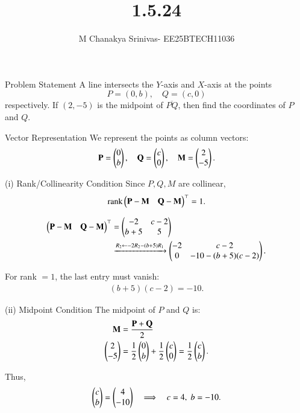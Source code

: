 \documentclass{beamer}
\title %
{1.5.24}
\date{}
\author %
{M Chanakya Srinivas- EE25BTECH11036}
\begin{document}
\begin{frame}
  \titlepage
\end{frame}



\begin{frame}{Problem Statement}
A line intersects the $Y$-axis and $X$-axis at the points
\[
P = (0,b), \quad Q = (c,0)
\]
respectively. If $(2,-5)$ is the midpoint of $\overline{PQ}$, then find the coordinates of $P$ and $Q$.
\end{frame}

\begin{frame}{Vector Representation}
We represent the points as column vectors:
\[
\mathbf P = \begin{pmatrix}0 \\ b\end{pmatrix}, \quad 
\mathbf Q = \begin{pmatrix}c \\ 0\end{pmatrix}, \quad
\mathbf M = \begin{pmatrix}2 \\ -5\end{pmatrix}.
\]
\end{frame}

\begin{frame}{(i) Rank/Collinearity Condition}
Since $P, Q, M$ are collinear,
\begin{align}
\operatorname{rank}\begin{pmatrix}\mathbf P - \mathbf M \quad \mathbf Q - \mathbf M\end{pmatrix}^{\top} = 1.
\end{align}

\begin{align}
\begin{pmatrix}\mathbf P - \mathbf M & \mathbf Q - \mathbf M\end{pmatrix}^{\top} 
&= \begin{pmatrix}-2 & c-2 \\ b+5 & 5\end{pmatrix} \\
&\xrightarrow{R_2 \leftarrow -2R_2 - (b+5)R_1}
\begin{pmatrix}-2 & c-2 \\ 0 & -10 - (b+5)(c-2)\end{pmatrix}.
\end{align}

For rank $=1$, the last entry must vanish:
\begin{align}
    (b+5)(c-2) = -10.
\end{align}
\end{frame}

\begin{frame}{(ii) Midpoint Condition}
The midpoint of $P$ and $Q$ is:
\begin{align}
\mathbf M &= \frac{\mathbf P + \mathbf Q}{2} \\
\begin{pmatrix}2 \\ -5\end{pmatrix} &= \frac{1}{2}\begin{pmatrix}0 \\ b\end{pmatrix} + \frac{1}{2}\begin{pmatrix}c \\ 0\end{pmatrix}
= \frac{1}{2}\begin{pmatrix}c \\ b\end{pmatrix}.
\end{align}

Thus,
\begin{align}
\begin{pmatrix}c \\ b\end{pmatrix} = \begin{pmatrix}4 \\ -10\end{pmatrix}
\quad\Longrightarrow\quad c=4, \; b=-10.
\end{align}


\end{frame}
\end{document}
